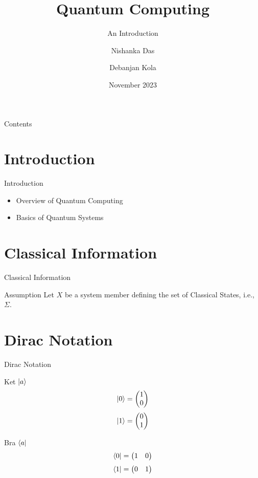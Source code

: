 \documentclass[12pt, aspectratio=169]{beamer}
\title{Quantum Computing}
\subtitle{An Introduction}
\author{Nishanka Das \and Debanjan Kola}
\date{November 2023}
\begin{document}
\maketitle

\begin{frame}[allowframebreaks]{Contents}
    \tableofcontents
\end{frame}

\section{Introduction}
\begin{frame}{Introduction}
    \begin{itemize}
        \item Overview of Quantum Computing
        \item Basics of Quantum Systems
    \end{itemize}
\end{frame}

\section{Classical Information}
\begin{frame}{Classical Information}
    \begin{block}{Assumption}
        Let $X$ be a system member defining the set of Classical States, i.e., $\Sigma$.
    \end{block}
\end{frame}

\section{Dirac Notation}
\begin{frame}{Dirac Notation}
    \begin{block}{Ket $\ket{a}$}
        \[
        \ket{0} = \begin{pmatrix} 1 \\ 0 \end{pmatrix}
        \]
        \[
        \ket{1} = \begin{pmatrix} 0 \\ 1 \end{pmatrix}
        \]
    \end{block}
    
    \begin{block}{Bra $\bra{a}$}
        \[
        \bra{0} = \begin{pmatrix} 1 & 0 \end{pmatrix}
        \]
        \[
        \bra{1} = \begin{pmatrix} 0 & 1 \end{pmatrix}
        \]
    \end{block}
\end{frame}
\end{document}
